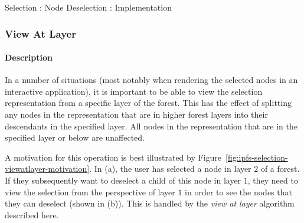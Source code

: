\begin{stulisting}[p]
\caption{Selection : Node Deselection : Implementation}
\label{code:ipfs-selection-deselectnodeimpl}

\end{stulisting}


\afterpage{\clearpage}
\newpage

\subsubsection{View At Layer}


\paragraph{Description}

In a number of situations (most notably when rendering the selected nodes in an interactive application), it is important to be able to view the selection representation from a specific layer of the forest. This has the effect of splitting any nodes in the representation that are in higher forest layers into their descendants in the specified layer. All nodes in the representation that are in the specified layer or below are unaffected.

A motivation for this operation is best illustrated by Figure~\ref{fig:ipfs-selection-viewatlayer-motivation}. In (a), the user has selected a node in layer $2$ of a forest. If they subsequently want to deselect a child of this node in layer $1$, they need to view the selection from the perspective of layer $1$ in order to see the nodes that they can deselect (shown in (b)). This is handled by the \emph{view at layer} algorithm described here.

